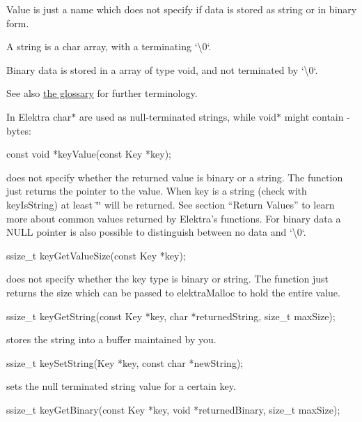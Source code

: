 \begin{DoxyItemize}
\item Value is just a name which does not specify if data is stored as string or in binary form.
\item A string is a char array, with a terminating `\textquotesingle{}\textbackslash{}0\textquotesingle{}`.
\item Binary data is stored in a array of type void, and not terminated by `\textquotesingle{}\textbackslash{}0\textquotesingle{}`.
\end{DoxyItemize}

See also \hyperlink{md_doc_help_elektra-glossary_doc_help_elektra-glossary_md}{the glossary} for further terminology.

In Elektra {\ttfamily char$\ast$} are used as null-\/terminated strings, while {\ttfamily void$\ast$} might contain {}-\/bytes\+: \begin{DoxyVerb}    const void *keyValue(const Key *key);
\end{DoxyVerb}


does not specify whether the returned value is binary or a string. The function just returns the pointer to the value. When {\ttfamily key} is a string (check with {\ttfamily key\+Is\+String}) at least {\ttfamily \char`\"{}\char`\"{}} will be returned. See section “\+Return Values” to learn more about common values returned by Elektra’s functions. For binary data a {\ttfamily N\+U\+LL} pointer is also possible to distinguish between no data and `\textquotesingle{}\textbackslash{}0\textquotesingle{}`. \begin{DoxyVerb}    ssize_t keyGetValueSize(const Key *key);
\end{DoxyVerb}


does not specify whether the key type is binary or string. The function just returns the size which can be passed to {\ttfamily elektra\+Malloc} to hold the entire value. \begin{DoxyVerb}    ssize_t keyGetString(const Key *key, char *returnedString, size_t maxSize);
\end{DoxyVerb}


stores the string into a buffer maintained by you. \begin{DoxyVerb}    ssize_t keySetString(Key *key, const char *newString);
\end{DoxyVerb}


sets the null terminated string value for a certain key. \begin{DoxyVerb}    ssize_t keyGetBinary(const Key *key, void *returnedBinary, size_t maxSize);
\end{DoxyVerb}


